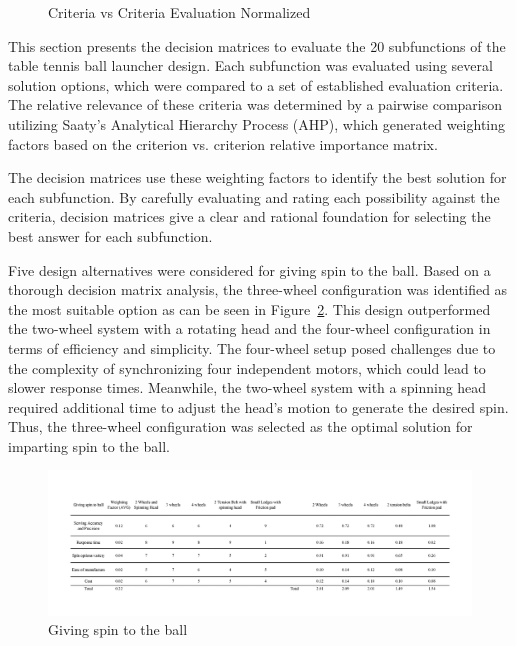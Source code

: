 \documentclass[12pt]{article}
\begin{document}
\begin{figure}[H]
    \centering
    \caption{Criteria vs Criteria Evaluation Normalized}
    \label{fig:cvc2} 
\end{figure}

This section presents the decision matrices to evaluate the 20 subfunctions of the table tennis ball launcher design. Each subfunction was evaluated using several solution options, which were compared to a set of established evaluation criteria. The relative relevance of these criteria was determined by a pairwise comparison utilizing Saaty's Analytical Hierarchy Process (AHP), which generated weighting factors based on the criterion vs. criterion relative importance matrix.

The decision matrices use these weighting factors to identify the best solution for each subfunction. By carefully evaluating and rating each possibility against the criteria, decision matrices give a clear and rational foundation for selecting the best answer for each subfunction.




Five design alternatives were considered for giving spin to the ball. Based on a thorough decision matrix analysis, the three-wheel configuration was identified as the most suitable option as can be seen in Figure~\ref{fig:spin}. This design outperformed the two-wheel system with a rotating head and the four-wheel configuration in terms of efficiency and simplicity. The four-wheel setup posed challenges due to the complexity of synchronizing four independent motors, which could lead to slower response times. Meanwhile, the two-wheel system with a spinning head required additional time to adjust the head's motion to generate the desired spin. Thus, the three-wheel configuration was selected as the optimal solution for imparting spin to the ball.
\begin{figure}[H]
    \centering
    \includegraphics[width=1\textwidth]{Decision matrices/spin.png}
    \caption{Giving spin to the ball}
    \label{fig:spin}
\end{figure}
\end{document}

